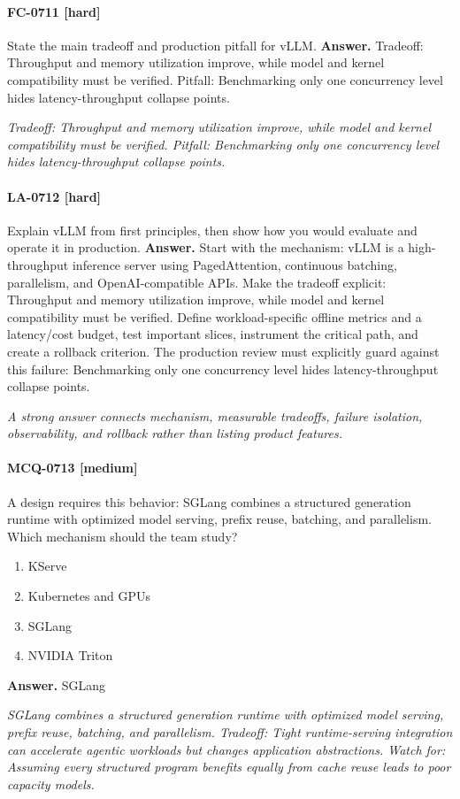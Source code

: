 \paragraph{FC-0711 [hard]} State the main tradeoff and production pitfall for vLLM.
\noindent\textbf{Answer.} Tradeoff: Throughput and memory utilization improve, while model and kernel compatibility must be verified. Pitfall: Benchmarking only one concurrency level hides latency-throughput collapse points.
\par\textit{Tradeoff: Throughput and memory utilization improve, while model and kernel compatibility must be verified. Pitfall: Benchmarking only one concurrency level hides latency-throughput collapse points.}
\paragraph{LA-0712 [hard]} Explain vLLM from first principles, then show how you would evaluate and operate it in production.
\noindent\textbf{Answer.} Start with the mechanism: vLLM is a high-throughput inference server using PagedAttention, continuous batching, parallelism, and OpenAI-compatible APIs. Make the tradeoff explicit: Throughput and memory utilization improve, while model and kernel compatibility must be verified. Define workload-specific offline metrics and a latency/cost budget, test important slices, instrument the critical path, and create a rollback criterion. The production review must explicitly guard against this failure: Benchmarking only one concurrency level hides latency-throughput collapse points.
\par\textit{A strong answer connects mechanism, measurable tradeoffs, failure isolation, observability, and rollback rather than listing product features.}
\paragraph{MCQ-0713 [medium]} A design requires this behavior: SGLang combines a structured generation runtime with optimized model serving, prefix reuse, batching, and parallelism. Which mechanism should the team study?
\begin{enumerate}[label=\Alph*.]
\item KServe
\item Kubernetes and GPUs
\item SGLang
\item NVIDIA Triton
\end{enumerate}
\noindent\textbf{Answer.} SGLang
\par\textit{SGLang combines a structured generation runtime with optimized model serving, prefix reuse, batching, and parallelism. Tradeoff: Tight runtime-serving integration can accelerate agentic workloads but changes application abstractions. Watch for: Assuming every structured program benefits equally from cache reuse leads to poor capacity models.}
